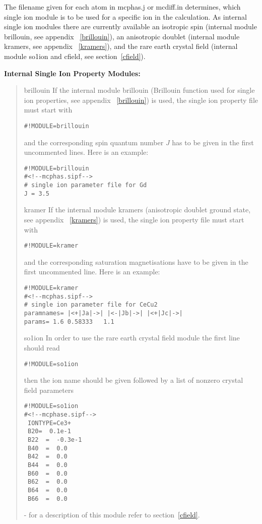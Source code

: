 The filename given for each atom in {\prg mcphas.j}
or {\prg mcdiff.in} determines, which single ion module 
is to be used for a specific ion in the calculation.
As internal single ion modules there are currently available an isotropic spin (internal module {\prg brillouin}, %
see
appendix ~\ref{brillouin}), an 
 anisotropic doublet (internal module {\prg kramers}, see appendix ~\ref{kramers}), 
and the rare earth crystal field (internal module {\prg so1ion} and
cfield, see section~\ref{cfield}).

\vspace{0.5cm} 
{\bf Internal Single Ion Property Modules:} 
\begin{quote}
\item[{\prg brillouin}]
If the internal module {\prg brillouin}
 (Brillouin function used for single ion properties,
  see appendix ~\ref{brillouin}) is used,
the single ion property file must start with
\begin{verbatim}#!MODULE=brillouin\end{verbatim} and
the corresponding spin
 quantum number $J$ has to be given in the first uncommented
lines.
Here is an example:
\begin{verbatim}
#!MODULE=brillouin
#<!--mcphas.sipf-->
# single ion parameter file for Gd
J = 3.5
\end{verbatim}
\item [{\prg kramer}] If the internal module {\prg kramers} (anisotropic doublet ground state, see appendix %
~\ref{kramers}) is used,
the single ion property file must start with
\begin{verbatim}#!MODULE=kramer\end{verbatim} and
the corresponding saturation magnetisations have to be given in the first uncommented
line.
Here is an example:
\begin{verbatim}
#!MODULE=kramer
#<!--mcphas.sipf-->
# single ion parameter file for CeCu2
paramnames= |<+|Ja|->| |<-|Jb|->| |<+|Jc|->|
params= 1.6 0.58333   1.1
\end{verbatim}
\item[{\prg so1ion\index{so1ion}}]In order to use the rare earth crystal field module the first line should read
\begin{verbatim}#!MODULE=so1ion\end{verbatim}

then the ion name should be given followed by a list of nonzero crystal field parameters

\begin{verbatim}
#!MODULE=so1ion
#<!--mcphase.sipf-->
 IONTYPE=Ce3+
 B20=  0.1e-1                                           
 B22  =  -0.3e-1                                       
 B40  =  0.0
 B42  =  0.0
 B44  =  0.0
 B60  =  0.0
 B62  =  0.0
 B64  =  0.0
 B66  =  0.0
\end{verbatim}

 - for a description of this module refer
to section~\ref{cfield}.
\end{quote}


